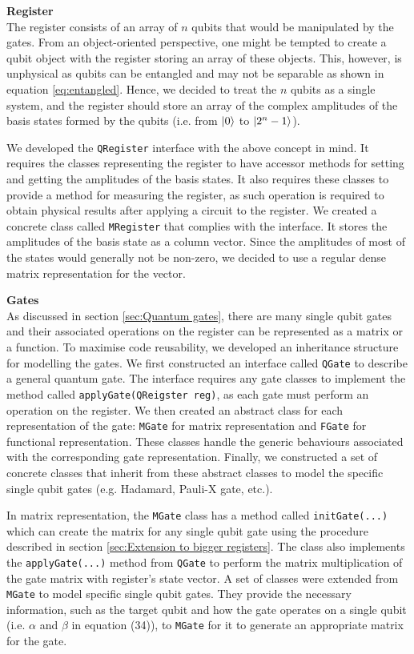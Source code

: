 \documentclass[bibliography=totocnumbered, 10pt]{article}
\newenvironment{myenumerate}{%
  \edef\backupindent{\the\parindent}%
  \enumerate%
  \setlength{\parindent}{\backupindent}%
}{\endenumerate}
\theoremstyle{NoticeStyle}
\begin{document}
\begin{myenumerate}
	\item \textbf{Register}\\
The register consists of an array of $n$ qubits that would be manipulated by the gates. From an object-oriented perspective, one might be tempted to create a qubit object with the register storing an array of these objects. This, however, is unphysical as qubits can be entangled and may not be separable as shown in equation \ref{eq:entangled}. Hence, we decided to treat the $n$ qubits as a single system, and the register should store an array of the complex amplitudes of the basis states formed by the qubits (i.e. from ${\left\vert{0}\right\rangle}$ to ${\left\vert{2^n-1}\right\rangle}$).

We developed the \texttt{QRegister} interface with the above concept in mind. It requires the classes representing the register to have accessor methods for setting and getting the amplitudes of the basis states. It also requires these classes to provide a method for measuring the register, as such operation is required to obtain physical results after applying a circuit to the register. We created a concrete class called \texttt{MRegister} that complies with the interface. It stores the amplitudes of the basis state as a column vector. Since the amplitudes of most of the states would generally not be non-zero, we decided to use a regular dense matrix representation for the vector.

	\item \textbf{Gates}\\
As discussed in section \ref{sec:Quantum gates}, there are many single qubit gates and their associated operations on the register can be represented as a matrix or a function. To maximise code reusability, we developed an inheritance structure for modelling the gates. We first constructed an interface called \texttt{QGate} to describe a general quantum gate. The interface requires any gate classes to implement the method called \texttt{applyGate(QReigster reg)}, as each gate must perform an operation on the register. We then created an abstract class for each representation of the gate: \texttt{MGate} for matrix representation and \texttt{FGate} for functional representation. These classes handle the generic behaviours associated with the corresponding gate representation. Finally, we constructed a set of concrete classes that inherit from these abstract classes to model the specific single qubit gates (e.g. Hadamard, Pauli-X gate, etc.).	

In matrix representation, the \texttt{MGate} class has a method called \texttt{initGate(...)} which can create the matrix for any single qubit gate using the procedure described in section \ref{sec:Extension to bigger registers}. The class also implements the \texttt{applyGate(...)} method from \texttt{QGate} to perform the matrix multiplication of the gate matrix with register's state vector. A set of classes were extended from \texttt{MGate} to model specific single qubit gates. They provide the necessary information, such as the target qubit and how the gate operates on a single qubit (i.e. $\alpha$ and $\beta$ in equation (34)), to \texttt{MGate} for it to generate an appropriate matrix for the gate.


\end{myenumerate}
\end{document}
